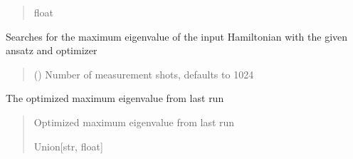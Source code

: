 \documentclass[letterpaper,10pt,english]{sphinxmanual}
\begin{document}
\begin{fulllineitems}
\begin{fulllineitems}
\begin{quote}
\begin{description}
\sphinxAtStartPar
float

\end{description}\end{quote}

\end{fulllineitems}


\begin{fulllineitems}
\label{\detokenize{qcompute_qapp.algorithm:qcompute_qapp.algorithm.QAOA.run}}
\pysigstartsignatures
{}
\pysigstopsignatures
\sphinxAtStartPar
Searches for the maximum eigenvalue of the input Hamiltonian with the given ansatz and optimizer
\begin{quote}\begin{description}
\sphinxAtStartPar
{} () \textendash{} Number of measurement shots, defaults to 1024

\end{description}\end{quote}

\end{fulllineitems}


\begin{fulllineitems}
\label{\detokenize{qcompute_qapp.algorithm:qcompute_qapp.algorithm.QAOA.maximum_eigenvalue}}
\pysigstartsignatures
{}
\pysigstopsignatures
\sphinxAtStartPar
The optimized maximum eigenvalue from last run
\begin{quote}\begin{description}
\sphinxAtStartPar
Optimized maximum eigenvalue from last run

\sphinxAtStartPar
Union{[}str, float{]}


\end{description}
\end{quote}
\end{fulllineitems}
\end{fulllineitems}
\end{document}
